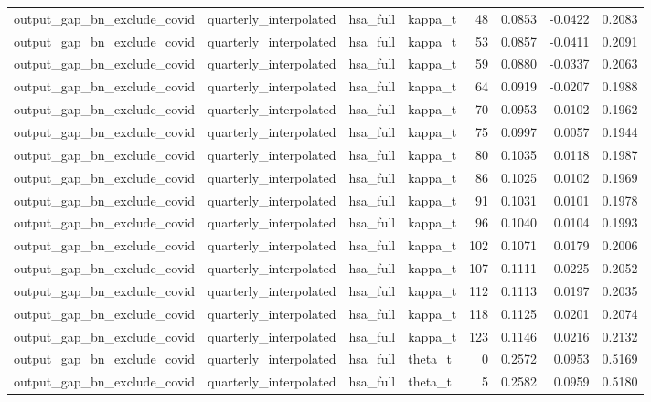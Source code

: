 \begin{tabular}{llllrrrr}
output\_gap\_bn\_exclude\_covid & quarterly\_interpolated & hsa\_full & kappa\_t & 48 & 0.0853 & -0.0422 & 0.2083 \\
output\_gap\_bn\_exclude\_covid & quarterly\_interpolated & hsa\_full & kappa\_t & 53 & 0.0857 & -0.0411 & 0.2091 \\
output\_gap\_bn\_exclude\_covid & quarterly\_interpolated & hsa\_full & kappa\_t & 59 & 0.0880 & -0.0337 & 0.2063 \\
output\_gap\_bn\_exclude\_covid & quarterly\_interpolated & hsa\_full & kappa\_t & 64 & 0.0919 & -0.0207 & 0.1988 \\
output\_gap\_bn\_exclude\_covid & quarterly\_interpolated & hsa\_full & kappa\_t & 70 & 0.0953 & -0.0102 & 0.1962 \\
output\_gap\_bn\_exclude\_covid & quarterly\_interpolated & hsa\_full & kappa\_t & 75 & 0.0997 & 0.0057 & 0.1944 \\
output\_gap\_bn\_exclude\_covid & quarterly\_interpolated & hsa\_full & kappa\_t & 80 & 0.1035 & 0.0118 & 0.1987 \\
output\_gap\_bn\_exclude\_covid & quarterly\_interpolated & hsa\_full & kappa\_t & 86 & 0.1025 & 0.0102 & 0.1969 \\
output\_gap\_bn\_exclude\_covid & quarterly\_interpolated & hsa\_full & kappa\_t & 91 & 0.1031 & 0.0101 & 0.1978 \\
output\_gap\_bn\_exclude\_covid & quarterly\_interpolated & hsa\_full & kappa\_t & 96 & 0.1040 & 0.0104 & 0.1993 \\
output\_gap\_bn\_exclude\_covid & quarterly\_interpolated & hsa\_full & kappa\_t & 102 & 0.1071 & 0.0179 & 0.2006 \\
output\_gap\_bn\_exclude\_covid & quarterly\_interpolated & hsa\_full & kappa\_t & 107 & 0.1111 & 0.0225 & 0.2052 \\
output\_gap\_bn\_exclude\_covid & quarterly\_interpolated & hsa\_full & kappa\_t & 112 & 0.1113 & 0.0197 & 0.2035 \\
output\_gap\_bn\_exclude\_covid & quarterly\_interpolated & hsa\_full & kappa\_t & 118 & 0.1125 & 0.0201 & 0.2074 \\
output\_gap\_bn\_exclude\_covid & quarterly\_interpolated & hsa\_full & kappa\_t & 123 & 0.1146 & 0.0216 & 0.2132 \\
output\_gap\_bn\_exclude\_covid & quarterly\_interpolated & hsa\_full & theta\_t & 0 & 0.2572 & 0.0953 & 0.5169 \\
output\_gap\_bn\_exclude\_covid & quarterly\_interpolated & hsa\_full & theta\_t & 5 & 0.2582 & 0.0959 & 0.5180 \\

\end{tabular}
